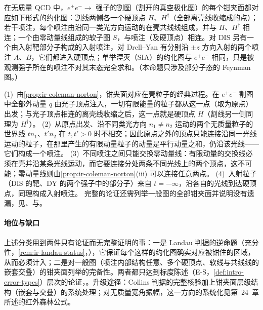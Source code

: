 \begin{proposition}\label{prop:ir-pinch-classification}
在无质量 QCD 中，$e^+e^-\to$ 强子的割图（割开的真空极化图）的每个钳夹面都对应如下形式的约化图：割线两侧各一个硬顶点 $H$、$H^\dagger$（全部离壳线收缩成的点）；若干喷注，每个喷注由沿同一类光方向运动的在壳共线线组成，并与 $H$、$H^\dagger$ 相连；一个由零动量线组成的软子图 $S$，与喷注（及硬顶点）相连。对 DIS 另有一个由入射靶部分子构成的入射喷注，对 Drell--Yan 有分别沿 $\pm z$ 方向入射的两个喷注 $A$、$B$，它们都进入硬顶点；单举湮灭（SIA）的约化图与 $e^+e^-$ 相同，只是被观测强子所在的喷注不对其末态完全求和。（本命题只涉及部分子态的 Feynman 图。）
\end{proposition}
\begin{proofsketch}
(1)~由\cref{prop:ir-coleman-norton}，钳夹面对应在壳粒子的经典过程。在 $e^+e^-$ 割图中全部外动量 $q$ 由光子顶点注入，一切有限能量的粒子都从这一点（取为原点）出发；与光子顶点相连的离壳线收缩之后，这一点就是硬顶点 $H$（割线另一侧同理为 $H^\dagger$）。
(2)~从原点出发、沿不同类光方向 $n_1\ne n_2$ 运动的两个无质量粒子的世界线 $tn_1$、$t'n_2$ 在 $t,t'>0$ 时不相交；因此原点之外的顶点只能连接沿同一光线运动的粒子，在那里产生的有限动量粒子的动量是平行动量之和，仍沿该光线——它们构成一个喷注。
(3)~不同喷注之间只能交换零动量线：有限动量的交换线必须在壳并沿某条光线运动，而它要连接分处两条不同光线上的两个顶点，这不可能；零动量线则由\cref{prop:ir-coleman-norton}(iii) 可以连接任意两点。
(4)~入射粒子（DIS 的靶、DY 的两个强子中的部分子）来自 $t=-\infty$，沿各自的光线到达硬顶点，同理构成入射喷注。
完整的论证还需列举一般图的全部钳夹面并说明没有遗漏，见\cite{Sterman1978a,Sterman1978b,LibbySterman1978a}、\cite[第~13~章]{Sterman1993}与\cite[第~5~章]{Collins2011}。
\end{proofsketch}

\paragraph{地位与缺口}
上述分类用到两件只有论证而无完整证明的事：一是 Landau 判据的逆命题（充分性，\cref{rem:ir-landau-status}，\tagA），它保证每个这样的约化图确实对应被钳住的区域，从而必须计入；二是对一般图（喷注内部结构任意、多个硬顶点、软线与共线线的嵌套交叠）的钳夹面列举的完备性。两者都只达到标度陈述（E-S，\cref{def:intro-error-types}）层次的论证\cite{Sterman1978a,LibbySterman1978a}，\cite[第~5~章]{Collins2011}。升级途径：Collins 判据的完整核验加上钳夹面层级结构（嵌套与交叠）的系统处理；对无质量宽角振幅，这一方向的系统化见第~24~章所述的红外森林公式。

